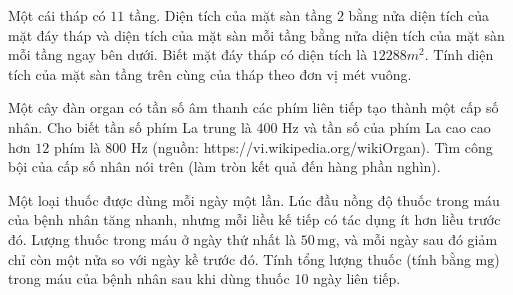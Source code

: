 \begin{bt} [TH] %
	Một cái tháp có $11$ tầng. Diện tích của mặt sàn tầng $2$ bằng nửa diện tích của mặt đáy tháp và diện tích của mặt sàn mỗi tầng bằng nửa diện tích của mặt sàn mỗi tầng ngay bên dưới. Biết mặt đáy tháp có diện tích là $12 288m^2$. Tính diện tích của mặt sàn tầng trên cùng của tháp theo đơn vị mét vuông.
\end{bt}

\begin{bt}[TH] %
	Một cây đàn organ có tần số âm thanh các phím liên tiếp tạo thành một cấp số nhân. Cho biết tần số phím La trung là $400$ Hz và tần số của phím La cao cao hơn $12$ phím là $800$ Hz (nguồn: https://vi.wikipedia.org/wikiOrgan). Tìm công bội của cấp số nhân nói trên (làm tròn kết quả đến hàng phần nghìn).
\end{bt}

\begin{bt}[VD]%
	Một loại thuốc được dùng mỗi ngày một lần. Lúc đầu nồng độ thuốc trong máu của bệnh nhân tăng nhanh, nhưng mỗi liều kế tiếp có tác dụng ít hơn liều trước đó. Lượng thuốc trong máu ở ngày thứ nhất là $50 \,\mathrm{mg}$, và mỗi ngày sau đó giảm chỉ còn một nửa so với ngày kề trước đó. Tính tổng lượng thuốc (tính bằng $\mathrm{mg}$) trong máu của bệnh nhân sau khi dùng thuốc $10$ ngày liên tiếp.
\end{bt}


